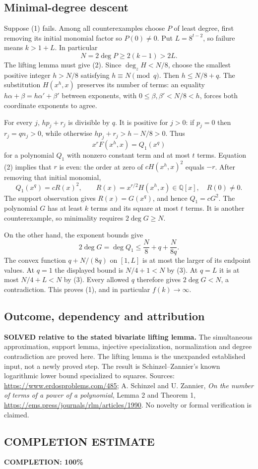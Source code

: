 \subsection*{Minimal-degree descent}
Suppose (1) fails. Among all counterexamples choose $P$ of least degree, first removing its initial monomial factor so $P(0)\ne0$. Put $L=8^{t-2}$, so failure means $k>1+L$. In particular
\[N=2\deg P\ge2(k-1)>2L.\tag{3}\]
The lifting lemma must give (2). Since $\deg_zH<N/8$, choose the smallest positive integer $h>N/8$ satisfying $h\equiv N\pmod q$. Then $h\le N/8+q$. The substitution $H(x^h,x)$ preserves its number of terms: an equality $h\alpha+\beta=h\alpha'+\beta'$ between exponents, with $0\le\beta,\beta'<N/8<h$, forces both coordinate exponents to agree.

For every $j$, $hp_j+r_j$ is divisible by $q$. It is positive for $j>0$: if $p_j=0$ then $r_j=qn_j>0$, while otherwise $hp_j+r_j>h-N/8>0$. Thus
\[x^rF(x^h,x)=Q_1(x^q)
\]
for a polynomial $Q_1$ with nonzero constant term and at most $t$ terms. Equation (2) implies that $r$ is even: the order at zero of $cH(x^h,x)^2$ equals $-r$. After removing that initial monomial,
\[Q_1(x^q)=cR(x)^2,\qquad R(x)=x^{r/2}H(x^h,x)\in\mathbb Q[x],\quad R(0)\ne0.
\]
The support observation gives $R(x)=G(x^q)$, and hence $Q_1=cG^2$. The polynomial $G$ has at least $k$ terms and its square at most $t$ terms. It is another counterexample, so minimality requires $2\deg G\ge N$.

On the other hand, the exponent bounds give
\[2\deg G=\deg Q_1\le\frac N8+q+\frac N{8q}.
\]
The convex function $q+N/(8q)$ on $[1,L]$ is at most the larger of its endpoint values. At $q=1$ the displayed bound is $N/4+1<N$ by (3). At $q=L$ it is at most $N/4+L<N$ by (3). Every allowed $q$ therefore gives $2\deg G<N$, a contradiction. This proves (1), and in particular $f(k)\to\infty$.

\subsection*{Outcome, dependency and attribution}
\textbf{SOLVED relative to the stated bivariate lifting lemma.} The simultaneous approximation, support lemma, injective specialization, normalization and degree contradiction are proved here. The lifting lemma is the unexpanded established input, not a newly proved step. The result is Schinzel--Zannier's known logarithmic lower bound specialized to squares.
Sources: \url{https://www.erdosproblems.com/485}; A. Schinzel and U. Zannier, \emph{On the number of terms of a power of a polynomial}, Lemma 2 and Theorem 1, \url{https://ems.press/journals/rlm/articles/1990}. No novelty or formal verification is claimed.

\subsection*{COMPLETION ESTIMATE}
\textbf{COMPLETION: 100\%}
